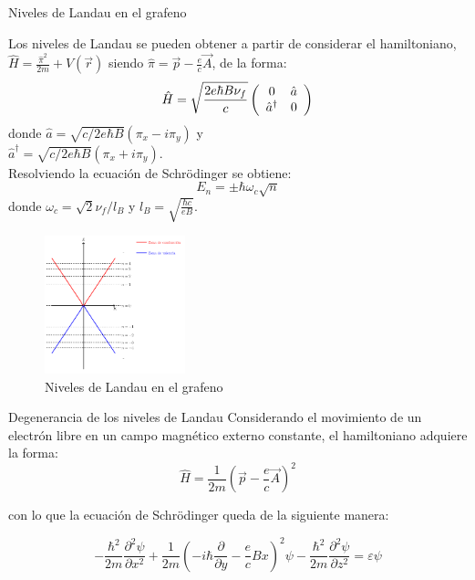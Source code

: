 \begin{frame}{Niveles de Landau en el grafeno}
	\begin{multicols}{2}
		\scriptsize{Los niveles de Landau se pueden obtener a partir de considerar el hamiltoniano,
			$\hat{H}=\frac{\hat{\pi}^2}{2m}+V(\vec{r})$ siendo $\hat{\pi}=\vec{p}- \frac{e}{c}\vec{A}$, de la forma:
			\begin{equation}
				\hat{H} = \sqrt{\frac{2e\hbar B \nu_f}{c}}
				\left( \begin{array}{c c}
					0&\hat{a}\\
					\hat{a}^\dagger&0
				\end{array} \right)
			\end{equation}
			donde $\hat{a}= \sqrt{c/2e\hbar B}(\pi_x-i\pi_y)$ y\\	$\hat{a}^\dagger=\sqrt{c/2e\hbar B}(\pi_x+i\pi_y)$.\\
			Resolviendo la ecuación de Schrödinger se obtiene:
			\begin{equation}
					E_n= \pm \hbar\omega_c \sqrt{n}
			\end{equation}
			donde $\omega_c = \sqrt{2}\nu_f/l_B$ y $l_B = \sqrt{\frac{\hbar c}{e B}}$.}
		\begin{figure}
			\includegraphics[height=4cm]{graficas/LL_grafeno.png}
			\caption{\scriptsize{Niveles de Landau en el grafeno}}
		\end{figure}
	\end{multicols}
\end{frame}

\begin{frame}{Degenerancia de los niveles de Landau}
	Considerando el movimiento de un electrón libre en un campo magnético externo constante,
	el hamiltoniano adquiere la forma:
	\begin{equation}
		\hat{H} = \frac{1}{2m}\left( \vec{p}-\frac{e}{c}\vec{A} \right)^2
		\label{hamil_nr}
	\end{equation}

	con lo que la ecuación de Schrödinger queda de la siguiente manera:

	\begin{equation}
			-\frac{\hbar^2}{2m}\frac{\partial^2\psi}{\partial x^2} + \frac{1}{2m} \left( -i\hbar \frac{\partial}{\partial y} -\frac{e}{c}Bx \right)^2 \psi - \frac{\hbar^2}{2m} \frac{\partial^2\psi}{\partial z^2} = \varepsilon \psi
			\label{sch_nr}
	\end{equation}
\end{frame}

